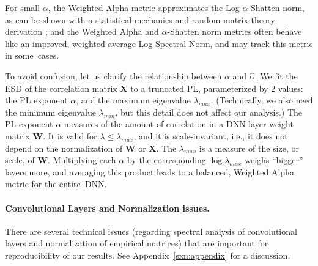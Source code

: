 \noindent
For small $\alpha$, the Weighted Alpha metric approximates the Log $\alpha$-Shatten norm, as can be shown with a statistical mechanics and random matrix theory derivation \cite{MM20_unpub_work}; and the Weighted Alpha and $\alpha$-Shatten norm metrics often behave like an improved, weighted average Log Spectral Norm, and may track this metric in some~cases.

To avoid confusion, let us clarify the relationship between $\alpha$ and $\hat{\alpha}$.  
We fit the ESD of the correlation matrix $\mathbf{X}$ to a truncated PL, parameterized by 2 values: the PL exponent $\alpha$, and the maximum eigenvalue $\lambda_{max}$.  
(Technically, we also need the minimum eigenvalue $\lambda_{min}$, but this detail does not affect our analysis.)
The PL exponent $\alpha$ measures of the amount of correlation in a DNN layer weight matrix $\mathbf{W}$. 
It is valid for $\lambda\le\lambda_{max}$, and it is scale-invariant, i.e., it does not depend on the normalization of $\mathbf{W}$ or $\mathbf{X}$.
The $\lambda_{max}$ is a measure of the size, or scale, of $\mathbf{W}$.
Multiplying each $\alpha$ by the corresponding $\log\lambda_{max}$ weighs ``bigger'' layers more, and averaging this product leads to a balanced, Weighted Alpha metric for the entire~DNN.


\paragraph{Convolutional Layers and Normalization issues.}
There are several technical issues (regarding spectral analysis of convolutional layers and normalization of empirical matrices) that are important for reproducibility of our results.
See Appendix~\ref{sxn:appendix} for a discussion.


